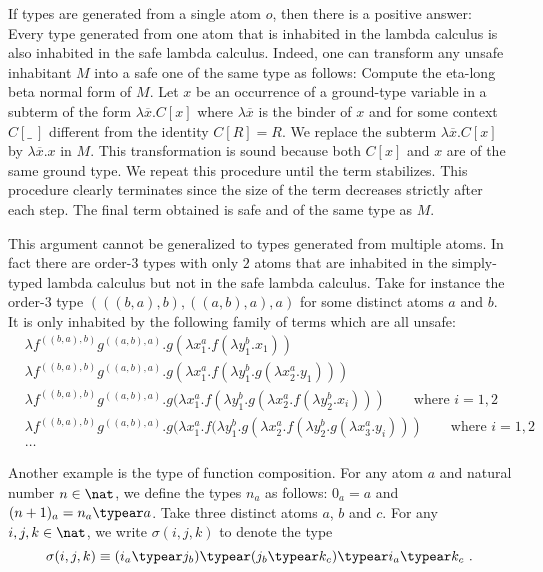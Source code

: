 If types are generated from a single atom $o$, then there is a
positive answer: Every type generated from one atom that is
inhabited in the lambda calculus is also inhabited in the safe
lambda calculus. Indeed, one can transform any unsafe inhabitant $M$
into a safe one of the same type as follows: Compute the eta-long
beta normal form of $M$. Let $x$ be an occurrence of a ground-type
variable in a subterm of the form $\lambda \overline{x} . C[x]$
where $\lambda \overline{x}$ is the binder of $x$ and for some
context $C[\_~]$ different from the identity $C[R]=R$. We replace
the subterm $\lambda \overline{x} . C[x]$ by $\lambda \overline{x}.
x$ in $M$. This transformation is sound because both $C[x]$ and $x$
are of the same ground type. We repeat this procedure until the term
stabilizes. This procedure clearly terminates since the size of the
term decreases strictly after each step. The final term obtained is
safe and of the same type as $M$.

This argument cannot be generalized to types generated from multiple
atoms. In fact there are order-$3$ types with only $2$ atoms that
are inhabited in the simply-typed lambda calculus but not in the
safe lambda calculus. Take for instance the order-$3$ type
 $( ((b, a), b),  ((a, b), a),  a)$ for some distinct atoms $a$ and $b$. It is only inhabited by the following family of terms which are all unsafe:
 \begin{align*}
& \lambda f^{((b, a), b)} g^{((a, b), a)} . g (\lambda x_1^a . f (\lambda y_1^b . x_1)) \\
&\lambda f^{((b, a), b)} g^{((a, b), a)} . g (\lambda x_1^a . f (\lambda y_1^b . g (\lambda x_2^a . y_1))) \\
&\lambda f^{((b, a), b)} g^{((a, b), a)} . g (\lambda x_1^a . f (\lambda y_1^b . g (\lambda x_2^a . f (\lambda y_2^b . x_i))) \qquad\mbox{where $i = 1, 2$} \\
&\lambda f^{((b, a), b)} g^{((a, b), a)} . g (\lambda x_1^a . f (\lambda y_1^b . g (\lambda x_2^a . f (\lambda y_2^b . g (\lambda x_3^a . y_i))) \qquad\mbox{where $i = 1, 2$} \\
&\ldots
\end{align*}

Another example is the type of function composition. For any atom
$a$ and natural number $n\in\nat$, we define the types $n_a$ as
follows: $0_a = a$ and $(n+1)_a = n_a \typear a$. Take three
distinct atoms $a$, $b$ and $c$. For any $i,j,k\in\nat$, we write
$\sigma(i,j,k)$ to denote the type
$$\sigma(i,j,k) \equiv (i_a \typear j_b) \typear (j_b \typear k_c) \typear i_a \typear
k_c \ .$$

